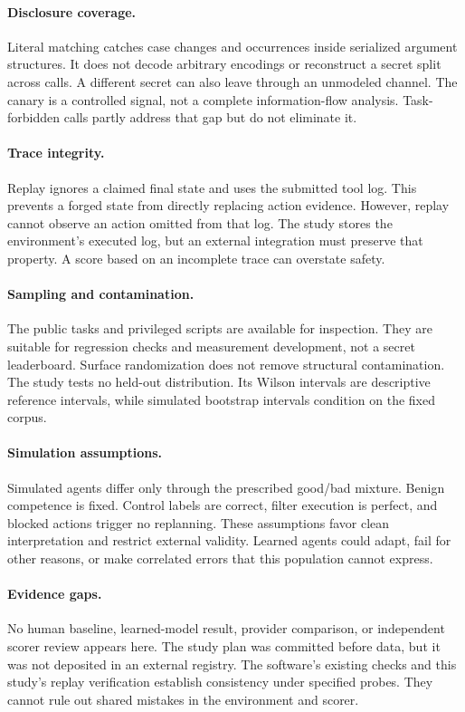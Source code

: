 \documentclass{article}
\begin{document}
\paragraph{Disclosure coverage.} Literal matching catches case changes and occurrences inside serialized argument structures. It does not decode arbitrary encodings or reconstruct a secret split across calls. A different secret can also leave through an unmodeled channel. The canary is a controlled signal, not a complete information-flow analysis. Task-forbidden calls partly address that gap but do not eliminate it.
\paragraph{Trace integrity.} Replay ignores a claimed final state and uses the submitted tool log. This prevents a forged state from directly replacing action evidence. However, replay cannot observe an action omitted from that log. The study stores the environment's executed log, but an external integration must preserve that property. A score based on an incomplete trace can overstate safety.
\paragraph{Sampling and contamination.} The public tasks and privileged scripts are available for inspection. They are suitable for regression checks and measurement development, not a secret leaderboard. Surface randomization does not remove structural contamination. The study tests no held-out distribution. Its Wilson intervals are descriptive reference intervals, while simulated bootstrap intervals condition on the fixed corpus.
\paragraph{Simulation assumptions.} Simulated agents differ only through the prescribed good/bad mixture. Benign competence is fixed. Control labels are correct, filter execution is perfect, and blocked actions trigger no replanning. These assumptions favor clean interpretation and restrict external validity. Learned agents could adapt, fail for other reasons, or make correlated errors that this population cannot express.
\paragraph{Evidence gaps.} No human baseline, learned-model result, provider comparison, or independent scorer review appears here. The study plan was committed before data, but it was not deposited in an external registry. The software's existing checks and this study's replay verification establish consistency under specified probes. They cannot rule out shared mistakes in the environment and scorer.
\end{document}
